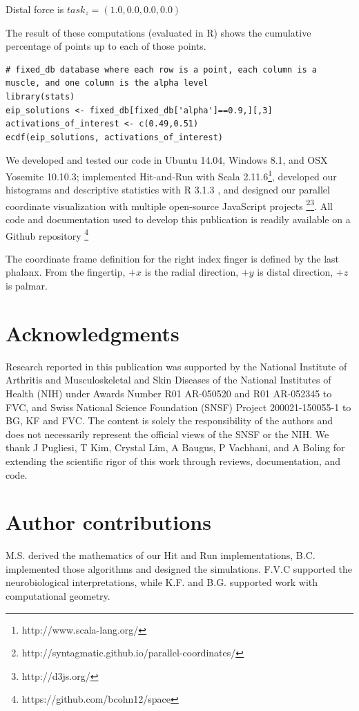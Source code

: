 \documentclass[10pt,letterpaper]{article}
\begin{document}
Distal force is $task_z = (1.0,0.0,0.0,0.0)$

The result of these computations (evaluated in R) shows the cumulative percentage of points up to each of those points.
\begin{verbatim}
# fixed_db database where each row is a point, each column is a muscle, and one column is the alpha level
library(stats)
eip_solutions <- fixed_db[fixed_db['alpha']==0.9,][,3]
activations_of_interest <- c(0.49,0.51)
ecdf(eip_solutions, activations_of_interest)
\end{verbatim}

We developed and tested our code in  Ubuntu 14.04, Windows 8.1, and OSX Yosemite 10.10.3; implemented Hit-and-Run with Scala 2.11.6\footnote{http://www.scala-lang.org/}, developed our histograms and descriptive statistics with R 3.1.3 \cite{rCoreCitation}, and designed our parallel coordinate visualization with multiple open-source JavaScript projects \footnote{http://syntagmatic.github.io/parallel-coordinates/}\footnote{http://d3js.org/}.
All code and documentation used to develop this publication is readily available on a Github repository \footnote{https://github.com/bcohn12/space}



The coordinate frame definition for the right index finger is defined by the last phalanx. From the fingertip, $+x$ is the radial direction, $+y$ is distal direction, $+z$ is palmar.


\section*{Acknowledgments}
Research reported in this publication was supported by the National Institute of Arthritis and Musculoskeletal and Skin Diseases of the National Institutes of Health (NIH) under Awards Number R01 AR-050520 and R01 AR-052345 to FVC, and Swiss National Science Foundation (SNSF) Project 200021-150055-1 to BG, KF and FVC. The content is solely the responsibility of the authors and does not necessarily represent the official views of the SNSF or the NIH. We thank J Pugliesi, T Kim, Crystal Lim, A Baugus, P Vachhani, and A Boling for extending the scientific rigor of this work through reviews, documentation, and code.

\section*{Author contributions}
M.S. derived the mathematics of our Hit and Run implementations, B.C. implemented those algorithms and designed the simulations. F.V.C supported the neurobiological interpretations, while K.F. and B.G. supported work with computational geometry.
\end{document}
